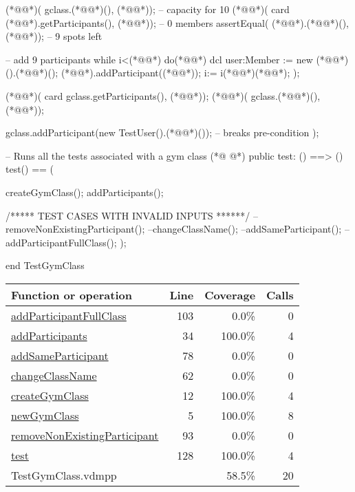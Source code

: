 \begin{vdmpp}[breaklines=true]
    (*@@*)( gclass.(*@@*)(), (*@@*));          -- capacity for 10 
    (*@@*)( card (*@@*).getParticipants(), (*@@*));   -- 0 members
    assertEqual( (*@@*).(*@@*)(), (*@@*));         -- 9 spots left
    
     -- add 9 participants
     while i<(*@@*) do(*@\vdmnotcovered{(}@*)
       dcl user:Member := new (*@@*)().(*@@*)();
       (*@@*).addParticipant((*@@*));
       i:= i(*@\vdmnotcovered{+}@*)(*@@*);
    ); 
       
    (*@@*)( card gclass.getParticipants(), (*@@*));
    (*@@*)( gclass.(*@@*)(), (*@@*));
    
    gclass.addParticipant(new TestUser().(*@@*)()); -- breaks pre-condition
 );
 
 
 -- Runs all the tests associated with a gym class
(*@
\label{test:128}
@*)
 public test: () ==> ()
 test() == (
  
   createGymClass();
    addParticipants();
    
    /***** TEST CASES WITH INVALID INPUTS ******/
    --removeNonExistingParticipant();
    --changeClassName();
    --addSameParticipant();
    --addParticipantFullClass();
 );

 
end TestGymClass
\end{vdmpp}
\bigskip
\begin{longtable}{|l|r|r|r|}
\hline
Function or operation & Line & Coverage & Calls \\
\hline
\hline
\hyperref[addParticipantFullClass:103]{addParticipantFullClass} & 103&0.0\% & 0 \\
\hline
\hyperref[addParticipants:34]{addParticipants} & 34&100.0\% & 4 \\
\hline
\hyperref[addSameParticipant:78]{addSameParticipant} & 78&0.0\% & 0 \\
\hline
\hyperref[changeClassName:62]{changeClassName} & 62&0.0\% & 0 \\
\hline
\hyperref[createGymClass:12]{createGymClass} & 12&100.0\% & 4 \\
\hline
\hyperref[newGymClass:5]{newGymClass} & 5&100.0\% & 8 \\
\hline
\hyperref[removeNonExistingParticipant:93]{removeNonExistingParticipant} & 93&0.0\% & 0 \\
\hline
\hyperref[test:128]{test} & 128&100.0\% & 4 \\
\hline
\hline
TestGymClass.vdmpp & & 58.5\% & 20 \\
\hline
\end{longtable}

